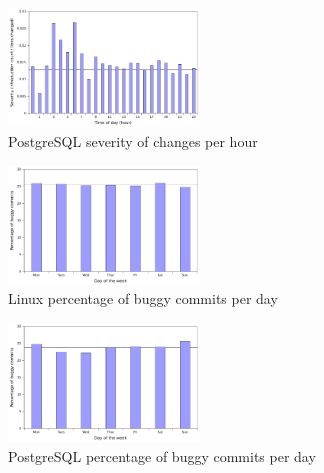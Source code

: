 \begin{figure}
\begin{center}
\includegraphics[width=0.45\textwidth]{postgresql-severity-hour.pdf}
\end{center}
\caption{PostgreSQL severity of changes per hour}
\label{fig-postgresql-severity-hour}
\end{figure}

\begin{figure}
\begin{center}
\includegraphics[width=0.45\textwidth]{linux-bugginess-day.pdf}
\end{center}
\caption{Linux percentage of buggy commits per day}
\label{fig-linux-bugginess-day}
\end{figure}

\begin{figure}
\begin{center}
\includegraphics[width=0.45\textwidth]{postgresql-bugginess-day.pdf}
\end{center}
\caption{PostgreSQL percentage of buggy commits per day}
\label{fig-postgresql-bugginess-day}
\end{figure}

